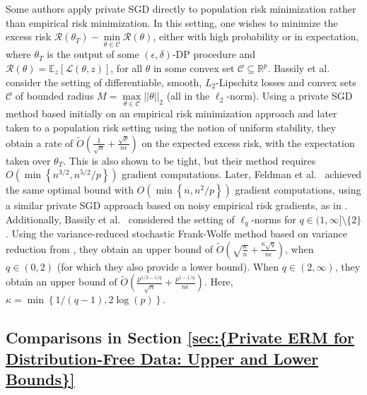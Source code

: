\documentclass{article}
\begin{document}
Some authors apply private SGD directly to population risk minimization rather than empirical risk minimization. In this setting, one wishes to minimize the excess risk $\mathcal{R}(\theta_T) - \mathop{\min}\limits_{\theta \in \mathcal{C}}\mathcal{R}(\theta)$, either with high probability or in expectation, where $\theta_T$ is the output of some $(\epsilon, \delta)$-DP procedure and $\mathcal{R}(\theta) = \mathbb{E}_z\left[\mathcal{L}(\theta, z)\right]$, for all $\theta$ in some convex set $\mathcal{C} \subseteq \mathbb{R}^p$. Bassily et al.~\cite{BasEtal19} consider the setting of differentiable, smooth, $L_2$-Lipschitz losses and convex sets $\mathcal{C}$ of bounded radius $M = \mathop{\max}\limits_{\theta \in \mathcal{C}}||\theta||_2$ (all in the $\ell_2$-norm). Using a private SGD method based initially on an empirical risk minimization approach and later taken to a population risk setting using the notion of uniform stability, they obtain a rate of $\widetilde{O}\left(\frac{1}{\sqrt{n}} + \frac{\sqrt{p}}{n\epsilon}\right)$ on the expected excess risk, with the expectation taken over $\theta_T$. This is also shown to be tight, but their method requires $O\left(\min\left\{n^{3/2}, n^{5/2}/p\right\}\right)$ gradient computations. Later, Feldman et al.~\cite{SCO_Feldman_2020} achieved the same optimal bound with $O\left(\min\left\{n, n^2/p\right\}\right)$ gradient computations, using a similar private SGD approach based on noisy empirical risk gradients, as in \cite{BasEtal19}. Additionally, Bassily et al.~\cite{BasEtal21} considered the setting of $\ell_q$-norms for $q \in (1, \infty]\setminus \{2\}$. Using the variance-reduced stochastic Frank-Wolfe method based on variance reduction from \cite{Var_Red_FW}, they obtain an upper bound of $\widetilde{O}\left(\sqrt{\frac{\kappa}{n}} + \frac{\kappa\sqrt{q}}{n\epsilon}\right)$, when $q \in (0, 2)$ (for which they also provide a lower bound). When $q \in (2, \infty)$, they obtain an upper bound of $\widetilde{O}\left(\frac{p^{1/2 - 1/q}}{\sqrt{n}} + \frac{p^{1 - 1/q}}{n\epsilon}\right)$. Here, $\kappa = \min\left\{1/(q - 1), 2\log(p)\right\}$.


\subsection{Comparisons in Section \ref{sec:{Private ERM for Distribution-Free Data: Upper and Lower Bounds}}}\label{sec:Comparison_SGD_Dist_Free}
\end{document}
